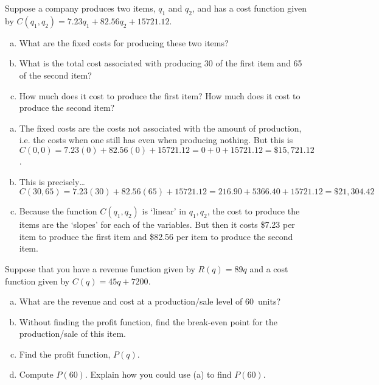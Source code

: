 \documentclass[11pt,letterpaper]{article}
\begin{document}
\newpage



 Suppose a company produces two items, $q_1$ and $q_2$, and has a cost function given by $C(q_1, q_2)= 7.23 q_1 + 82.56 q_2 + 15721.12$. 
	\begin{enumerate}[(a)]
	\item What are the fixed costs for producing these two items?
	\item What is the total cost associated with producing 30 of the first item and 65 of the second item?
	\item How much does it cost to produce the first item? How much does it cost to produce the second item?
	\end{enumerate} \pspace

\sol 
\begin{enumerate}[(a)]
\item The fixed costs are the costs not associated with the amount of production, i.e. the costs when one still has even when producing nothing. But this is $C(0, 0)= 7.23(0) + 82.56(0) + 15721.12= 0 + 0 + 15721.12= \$15,\!721.12$. \pspace

\item This is precisely\dots
	\[
	C(30, 65)= 7.23 (30) + 82.56 (65) + 15721.12= 216.90 + 5366.40 + 15721.12= \$21,\!304.42
	\] \pspace

\item Because the function $C(q_1, q_2)$ is `linear' in $q_1, q_2$, the cost to produce the items are the `slopes' for each of the variables. But then it costs \$7.23 per item to produce the first item and \$82.56 per item to produce the second item. 
\end{enumerate}



\newpage



 Suppose that you have a revenue function given by $R(q)= 89q$ and a cost function given by $C(q)= 45q + 7200$. 
	\begin{enumerate}[(a)]
	\item What are the revenue and cost at a production/sale level of 60~units?
	\item Without finding the profit function, find the break-even point for the production/sale of this item.
	\item Find the profit function, $P(q)$.
	\item Compute $P(60)$. Explain how you could use (a) to find $P(60)$. 
	\end{enumerate} \pspace
\end{document}

